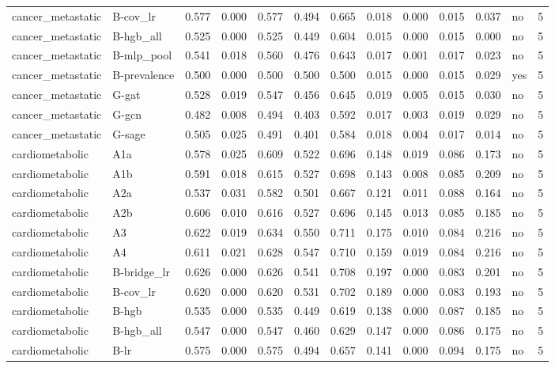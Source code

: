 \begin{table}[t]
\begin{tabular}{lllllllllllll}
cancer\_metastatic & B-cov\_lr & 0.577 & 0.000 & 0.577 & 0.494 & 0.665 & 0.018 & 0.000 & 0.015 & 0.037 & no & 5 \\
cancer\_metastatic & B-hgb\_all & 0.525 & 0.000 & 0.525 & 0.449 & 0.604 & 0.015 & 0.000 & 0.015 & 0.000 & no & 5 \\
cancer\_metastatic & B-mlp\_pool & 0.541 & 0.018 & 0.560 & 0.476 & 0.643 & 0.017 & 0.001 & 0.017 & 0.023 & no & 5 \\
cancer\_metastatic & B-prevalence & 0.500 & 0.000 & 0.500 & 0.500 & 0.500 & 0.015 & 0.000 & 0.015 & 0.029 & yes & 5 \\
cancer\_metastatic & G-gat & 0.528 & 0.019 & 0.547 & 0.456 & 0.645 & 0.019 & 0.005 & 0.015 & 0.030 & no & 5 \\
cancer\_metastatic & G-gcn & 0.482 & 0.008 & 0.494 & 0.403 & 0.592 & 0.017 & 0.003 & 0.019 & 0.029 & no & 5 \\
cancer\_metastatic & G-sage & 0.505 & 0.025 & 0.491 & 0.401 & 0.584 & 0.018 & 0.004 & 0.017 & 0.014 & no & 5 \\
cardiometabolic & A1a & 0.578 & 0.025 & 0.609 & 0.522 & 0.696 & 0.148 & 0.019 & 0.086 & 0.173 & no & 5 \\
cardiometabolic & A1b & 0.591 & 0.018 & 0.615 & 0.527 & 0.698 & 0.143 & 0.008 & 0.085 & 0.209 & no & 5 \\
cardiometabolic & A2a & 0.537 & 0.031 & 0.582 & 0.501 & 0.667 & 0.121 & 0.011 & 0.088 & 0.164 & no & 5 \\
cardiometabolic & A2b & 0.606 & 0.010 & 0.616 & 0.527 & 0.696 & 0.145 & 0.013 & 0.085 & 0.185 & no & 5 \\
cardiometabolic & A3 & 0.622 & 0.019 & 0.634 & 0.550 & 0.711 & 0.175 & 0.010 & 0.084 & 0.216 & no & 5 \\
cardiometabolic & A4 & 0.611 & 0.021 & 0.628 & 0.547 & 0.710 & 0.159 & 0.019 & 0.084 & 0.216 & no & 5 \\
cardiometabolic & B-bridge\_lr & 0.626 & 0.000 & 0.626 & 0.541 & 0.708 & 0.197 & 0.000 & 0.083 & 0.201 & no & 5 \\
cardiometabolic & B-cov\_lr & 0.620 & 0.000 & 0.620 & 0.531 & 0.702 & 0.189 & 0.000 & 0.083 & 0.193 & no & 5 \\
cardiometabolic & B-hgb & 0.535 & 0.000 & 0.535 & 0.449 & 0.619 & 0.138 & 0.000 & 0.087 & 0.185 & no & 5 \\
cardiometabolic & B-hgb\_all & 0.547 & 0.000 & 0.547 & 0.460 & 0.629 & 0.147 & 0.000 & 0.086 & 0.175 & no & 5 \\
cardiometabolic & B-lr & 0.575 & 0.000 & 0.575 & 0.494 & 0.657 & 0.141 & 0.000 & 0.094 & 0.175 & no & 5 \\

\end{tabular}
\end{table}
